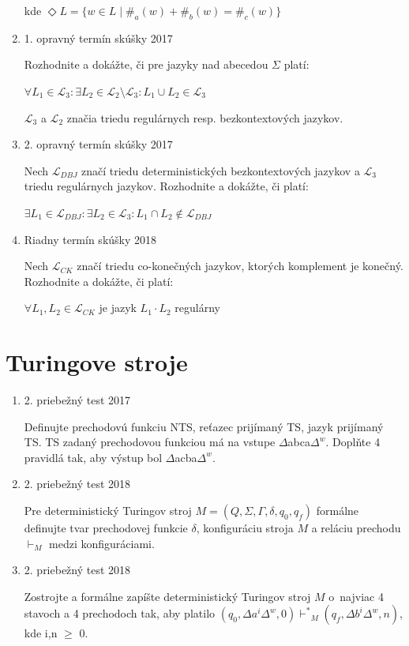 \documentclass[11pt,a4paper]{article}
\begin{document}
\begin{enumerate}
		kde $\Diamond L = \{w \in L \mid \#_a(w) + \#_b(w) = \#_c(w)\}$

		\item 1. opravný termín skúšky 2017

		Rozhodnite a dokážte, či pre jazyky nad abecedou $\Sigma$ platí:

		$\forall L_1 \in \mathcal{L}_3: \exists L_2 \in \mathcal{L}_2 \setminus \mathcal{L}_3: L_1 \cup L_2 \in \mathcal{L}_3$

		$\mathcal{L}_3$ a $\mathcal{L}_2$ značia triedu regulárnych resp. bezkontextových jazykov.

		\item 2. opravný termín skúšky 2017

		Nech $\mathcal{L}_{DBJ}$ značí triedu deterministických bezkontextových jazykov a $\mathcal{L}_{3}$ triedu regulárnych jazykov. Rozhodnite a dokážte, či platí:

		$\exists L_1 \in \mathcal{L}_{DBJ}: \exists L_2 \in \mathcal{L}_{3}: L_1 \cap L_2 \notin \mathcal{L}_{DBJ}$

		\item Riadny termín skúšky 2018

		Nech $\mathcal{L}_{CK}$ značí triedu co-konečných jazykov, ktorých komplement je konečný. Rozhodnite a dokážte, či platí:

		$\forall L_1, L_2 \in \mathcal{L}_{CK}$ je jazyk $L_1 \cdot L_2$ regulárny
	\end{enumerate}

	\section{Turingove stroje}

	\begin{enumerate}
		\item 2. priebežný test 2017

		Definujte prechodovú funkciu NTS, reťazec prijímaný TS, jazyk prijímaný TS. TS zadaný prechodovou funkciou má na vstupe $\Delta$abca$\Delta^{w}$. Doplňte 4 pravidlá tak, aby výstup bol $\Delta$acba$\Delta^w$.

		\item 2. priebežný test 2018

		Pre deterministický Turingov stroj $M = (Q, \Sigma, \Gamma, \delta, q_0, q_f)$ formálne definujte tvar prechodovej funkcie $\delta$, konfiguráciu stroja $M$ a reláciu prechodu $\vdash_M$ medzi konfiguráciami.

		\item 2. priebežný test 2018

		Zostrojte a formálne zapíšte deterministický Turingov stroj $M$ o~najviac 4 stavoch a 4 prechodoch tak, aby platilo $(q_0, \Delta a^i\Delta^w, 0) {\vdash^*}_M (q_f, \Delta b^i\Delta^w, n)$, kde i,n $\geq$ 0.
	\end{enumerate}
\end{document}
